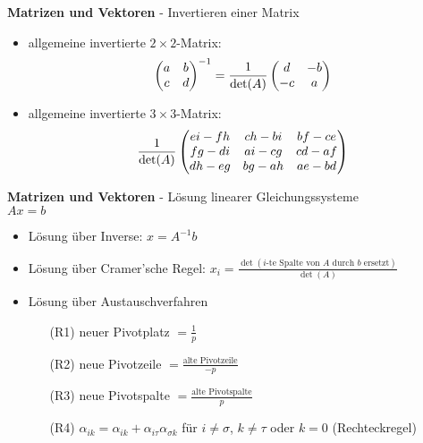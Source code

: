 \documentclass[10pt,landscape,a4paper]{article}
\begin{document}
\begin{multicols*}{4}
\begin{center}
	\normalsize{\textbf{Matrizen und Vektoren} - Invertieren einer Matrix} \\
\end{center}
\begin{itemize}
	\item allgemeine invertierte $2\times 2$-Matrix:
	\begin{align}
		\begin{pmatrix}
			a & b \\ c & d
		\end{pmatrix}^{-1} = \frac{1}{\det(A)}\begin{pmatrix}
			d & -b \\ -c & a
		\end{pmatrix}\notag
	\end{align}
	\item allgemeine invertierte $3\times 3$-Matrix:
	\begin{align}
		\frac{1}{\det(A)}\begin{pmatrix}
			ei-fh & ch-bi & bf-ce \\ fg-di & ai-cg & cd-af \\ dh-eg & bg-ah & ae-bd
		\end{pmatrix}\notag
	\end{align}
\end{itemize}

\begin{center}
	\normalsize{\textbf{Matrizen und Vektoren} - Lösung linearer Gleichungssysteme} \\
	\scriptsize $Ax=b$
\end{center}
\begin{itemize}
	\item Lösung über Inverse: $x=A^{-1}b$
	\item Lösung über Cramer'sche Regel: $x_i = \frac{\det(\text{$i$-te Spalte von $A$ durch $b$ ersetzt})}{\det(A)}$
	\item Lösung über Austauschverfahren
	\begin{itemize}
		\setlength{\itemindent}{0.2cm}
		\item[(R1)] neuer Pivotplatz $=\frac{1}{p}$
		\item[(R2)] neue Pivotzeile $= \frac{\text{alte Pivotzeile}}{-p}$
		\item[(R3)] neue Pivotspalte $= \frac{\text{alte Pivotspalte}}{p}$
		\item[(R4)] $\alpha_{ik} = \alpha_{ik} + \alpha_{i\tau}\alpha_{\sigma k}$ für $i\neq\sigma$, $k\neq\tau$ oder $k=0$ (Rechteckregel)
	\end{itemize}
\end{itemize}


\end{multicols*}
\end{document}
